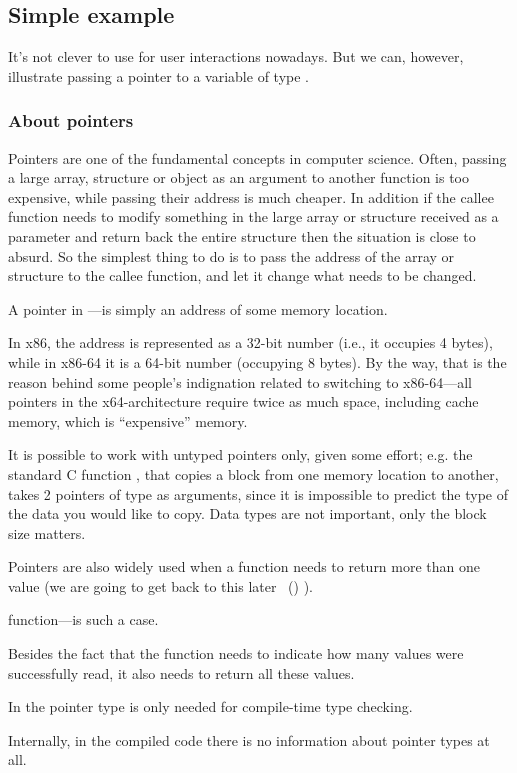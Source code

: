 \subsection{Simple example}



It's not clever to use \scanf for user interactions nowadays. 
But we can, however, illustrate passing a pointer to a variable of type \Tint.

\subsubsection{About pointers}
\myindex{\CLanguageElements!\Pointers}

Pointers are one of the fundamental concepts in computer science.
Often, passing a large array, structure or object as an argument to another function is too expensive, while passing their address is much cheaper.
In addition if the \gls{callee} function needs to modify something in the large array or structure received as a parameter and return back the entire structure then the situation is close to absurd.
So the simplest thing to do is to pass the address of the array or structure to the \gls{callee} function, and let it change what needs to be changed.

A pointer in \CCpp---is simply an address of some memory location.

In x86, the address is represented as a 32-bit number (i.e., it occupies 4 bytes), while in x86-64 it is a 64-bit number (occupying 8 bytes).
By the way, that is the reason behind some people's indignation related to switching to x86-64---all pointers in the x64-architecture require twice as much space, including cache memory, which is ``expensive'' memory.

It is possible to work with untyped pointers only, given some effort; e.g. the standard C function , that copies a block from one memory location to another,
takes 2 pointers of type  as arguments, since it is impossible to predict the type of the data you would like to copy. Data types are not important, only the block size matters.

Pointers are also widely used when a function needs to return more than one value
(we are going to get back to this later
~()
).

 function---is such a case.

Besides the fact that the function needs to indicate how many values were successfully read, it also needs to return all these values.

In \CCpp the pointer type is only needed for compile-time type checking.

Internally, in the compiled code there is no information about pointer types at all.





